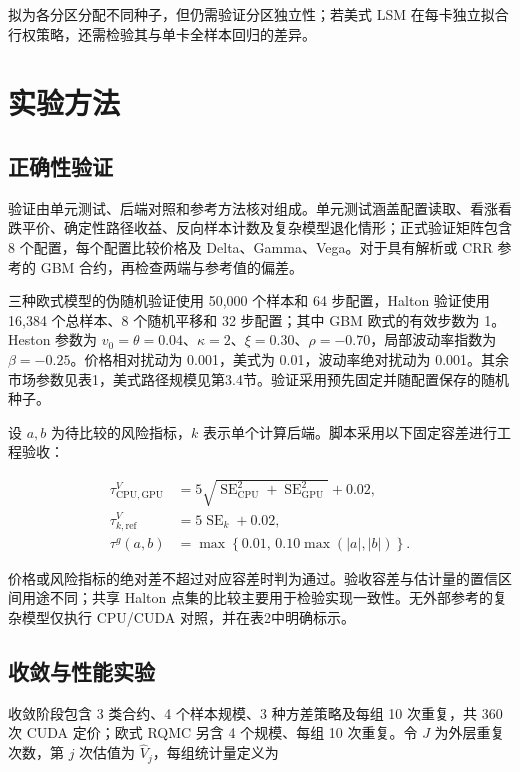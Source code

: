 \documentclass[UTF8,a4paper,zihao=5,fontset=none]{ctexart}
\begin{document}
拟为各分区分配不同种子，但仍需验证分区独立性；若美式 LSM 在每卡独立拟合行权策略，还需检验其与单卡全样本回归的差异。


\section{实验方法}

\subsection{正确性验证}

验证由单元测试、后端对照和参考方法核对组成。单元测试涵盖配置读取、看涨看跌平价、确定性路径收益、反向样本计数及复杂模型退化情形；正式验证矩阵包含 8 个配置，每个配置比较价格及 Delta、Gamma、Vega。对于具有解析或 CRR 参考的 GBM 合约，再检查两端与参考值的偏差。


三种欧式模型的伪随机验证使用 50,000 个样本和 64 步配置，Halton 验证使用 16,384 个总样本、8 个随机平移和 32 步配置；其中 GBM 欧式的有效步数为 1。Heston 参数为 $v_0=\theta=0.04$、$\kappa=2$、$\xi=0.30$、$\rho=-0.70$，局部波动率指数为 $\beta=-0.25$。价格相对扰动为 0.001，美式为 0.01，波动率绝对扰动为 0.001。其余市场参数见表1，美式路径规模见第3.4节。验证采用预先固定并随配置保存的随机种子。


设 $a,b$ 为待比较的风险指标，$k$ 表示单个计算后端。脚本采用以下固定容差进行工程验收：


\nopagebreak[4]
\begin{equation}
\label{eq:12}
\begin{aligned}
\tau_{\mathrm{CPU,GPU}}^{V}
&=5\sqrt{\operatorname{SE}_{\mathrm{CPU}}^2
+\operatorname{SE}_{\mathrm{GPU}}^2}+0.02,\\
\tau_{k,\mathrm{ref}}^{V}&=5\operatorname{SE}_k+0.02,\\
\tau^{g}(a,b)&=\max\!\left\{0.01,\,
0.10\max(\lvert a\rvert,\lvert b\rvert)\right\}.
\end{aligned}
\end{equation}

价格或风险指标的绝对差不超过对应容差时判为通过。验收容差与估计量的置信区间用途不同；共享 Halton 点集的比较主要用于检验实现一致性。无外部参考的复杂模型仅执行 CPU/CUDA 对照，并在表2中明确标示。


\subsection{收敛与性能实验}

收敛阶段包含 3 类合约、4 个样本规模、3 种方差策略及每组 10 次重复，共 360 次 CUDA 定价；欧式 RQMC 另含 4 个规模、每组 10 次重复。令 $J$ 为外层重复次数，第 $j$ 次估值为 $\widehat V_j$，每组统计量定义为
\end{document}
